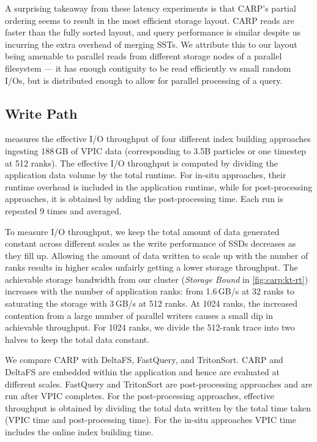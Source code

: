A surprising takeaway from these latency experiments is that CARP's partial ordering seems to
result in the most efficient storage layout.
CARP reads are faster than the fully sorted layout, and query performance is similar despite us
incurring the extra overhead of merging SSTs.
We attribute this to our layout being amenable to parallel reads from different storage nodes of a
parallel filesystem --- it has enough contiguity to be read efficiently vs small random I/Os, but
is distributed enough to allow for parallel processing of a query.

\subsection{Write Path}
\label{sec:carp:eval_write}

\figCarpKtRt

\vspace{5pt}

 measures the effective I/O throughput of four different index building
approaches ingesting 188\,GB of VPIC data (corresponding to 3.5B particles or one timestep at 512
ranks).
The effective I/O throughput is computed by dividing the application data volume by the total
runtime.
For in-situ approaches, their runtime overhead is included in the application runtime, while for
post-processing approaches, it is obtained by adding the post-processing time.
Each run is repeated 9 times and averaged.

To measure I/O throughput, we keep the total amount of data generated constant across different
scales as the write performance of SSDs decreases as they fill up.
Allowing the amount of data written to scale up with the number of ranks results in higher scales
unfairly getting a lower storage throughput.
The achievable storage bandwidth from our cluster (\emph{Storage Bound} in \cref{fig:carp:kt-rt})
increases with the number of application ranks: from 1.6\,GB/s at 32 ranks to saturating the storage
with 3\,GB/s at 512 ranks.
At 1024 ranks, the increased contention from a large number of parallel writers causes a small dip
in achievable throughput.
For 1024 ranks, we divide the 512-rank trace into two halves to keep the total data constant.

We compare CARP with DeltaFS, FastQuery, and TritonSort.
CARP and DeltaFS are embedded within the application and hence are evaluated at different scales.
FastQuery and TritonSort are post-processing approaches and are run after VPIC completes.
For the post-processing approaches, effective throughput is obtained by dividing the total data
written by the total time taken (VPIC time and post-processing time).
For the in-situ approaches VPIC time includes the online index building time.

